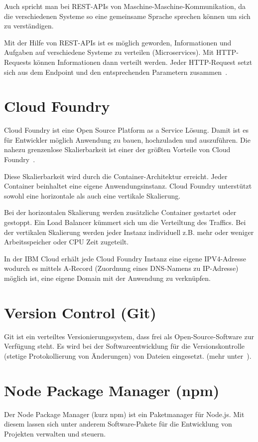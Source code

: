 Auch spricht man bei REST-APIs von Maschine-Maschine-Kommunikation, da die verschiedenen Systeme so eine gemeinsame
Sprache sprechen können um sich zu verständigen.

Mit der Hilfe von REST-APIs ist es möglich geworden, Informationen und Aufgaben auf verschiedene Systeme zu verteilen
(Microservices). Mit HTTP-Requests können Informationen dann verteilt werden. Jeder HTTP-Request setzt sich aus dem
Endpoint und den entsprechenden Parametern zusammen~\cite{online_grundlagen_rest}.

\section{Cloud Foundry}
Cloud Foundry ist eine Open Source Platform as a Service Lösung. Damit ist es für Entwickler möglich Anwendung zu bauen,
hochzuladen und auszuführen. Die nahezu grenzenlose Skalierbarkeit ist einer der größten Vorteile von Cloud
Foundry~\cite{book_grundlagen_cloudfoundry}.

Diese Skalierbarkeit wird durch die Container-Architektur erreicht. Jeder Container beinhaltet eine eigene
Anwendungsinstanz. Cloud Foundry unterstützt sowohl eine horizontale als auch eine vertikale Skalierung.

Bei der horizontalen Skalierung werden zusätzliche Container gestartet oder gestoppt. Ein Load Balancer kümmert sich um
die Verteiltung des Traffics. Bei der vertikalen Skalierung werden jeder Instanz individuell z.B. mehr oder weniger
Arbeitsspeicher oder CPU Zeit zugeteilt.

In der IBM Cloud erhält jede Cloud Foundry Instanz eine eigene IPV4-Adresse wodurch es mittels A-Record (Zuordnung eines
DNS-Namens zu IP-Adresse) möglich ist, eine eigene Domain mit der Anwendung zu verknüpfen.

\section{Version Control (Git)}
Git ist ein verteiltes Versionierungssystem, dass frei als Open-Source-Software zur Verfügung steht. Es wird bei der
Softwareentwicklung für die Versionskontrolle (stetige Protokollierung von Änderungen) von Dateien eingesetzt. (mehr
unter~\cite{book_grundlagen_git}).

\section{Node Package Manager (npm)}
Der Node Package Manager (kurz npm) ist ein Paketmanager für Node.js. Mit diesem lassen sich unter anderem
Software-Pakete für die Entwicklung von Projekten verwalten und steuern.

